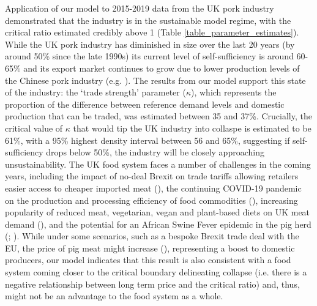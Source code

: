 \documentclass[12pt]{article}
\begin{document}
Application of our model to 2015-2019 data from the UK pork industry demonstrated that the industry is in the sustainable model regime, with the critical ratio estimated credibly above 1 (Table \ref{table_parameter_estimates}). While the UK pork industry has diminished in size over the last 20 years (by around 50\% since the late 1990s) its current level of self-sufficiency is around 60-65\% and its export market continues to grow due to lower production levels of the Chinese pork industry (e.g. \cite{AHDBexports2020}). The results from our model support this state of the industry: the `trade strength' parameter ($\kappa$), which represents the proportion of the difference between reference demand levels and domestic production that can be traded, was estimated between 35 and 37\%. Crucially, the critical value of $\kappa$ that would tip the UK industry into collaspe is estimated to be 61\%, with a 95\% highest density interval between 56 and 65\%, suggesting if self-sufficiency drops below 50\%, the industry will be closely approaching unsustainability. The UK food system faces a number of challenges in the coming years, including the impact of no-deal Brexit on trade tariffs allowing retailers easier access to cheaper imported meat (\cite{feng2017}), the continuing COVID-19 pandemic on the production and processing efficiency of food commodities (\cite{power2020}), increasing popularity of reduced meat, vegetarian, vegan and plant-based diets on UK meat demand (\cite{james2020}), and the potential for an African Swine Fever epidemic in the pig herd (\cite{normile2019}; \cite{mason2020}). While under some scenarios, such as a bespoke Brexit trade deal with the EU, the price of pig meat might increase (\cite{feng2017}), representing a boost to domestic producers, our model indicates that this result is also consistent with a food system coming closer to the critical boundary delineating collapse (i.e. there is a negative relationship between long term price and the critical ratio) and, thus, might not be an advantage to the food system as a whole.
\end{document}
